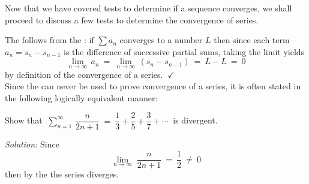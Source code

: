 Now that we have covered tests to determine if a sequence converges,
we shall proceed to discuss a few tests to determine the convergence
of series.


The  follows from the
: if $\sum a_n$ converges to a number $L$
then since each term $a_n = s_n - s_{n-1}$ is the difference of successive
partial sums, taking the limit yields
\[
\lim_{n \to \infty} \,a_n ~=~ \lim_{n \to \infty} \,(s_n - s_{n-1}) ~=~ L - L ~=~ 0
\]
by definition of the convergence of a series. $~\checkmark$\\Since the  can never be used to prove convergence of a series, it is often stated
in the following logically equivalent manner:

\label{cmnt:nthtermtestdiv}

\begin{exmp}
\noindent Show that $~\displaystyle\sum_{n=1}^{\infty} \,\dfrac{n}{2n+1} ~=~
\dfrac{1}{3} + \dfrac{2}{5} + \dfrac{3}{7} + \cdots~$ is
divergent.\vspace{1mm}
\par\noindent\emph{Solution:} Since
\[
\lim_{n \to \infty} \;\frac{n}{2n+1} ~=~ \frac{1}{2} ~\ne ~ 0
\]
then by the  the series diverges.
\end{exmp}
\divider
\vspace{2mm}


